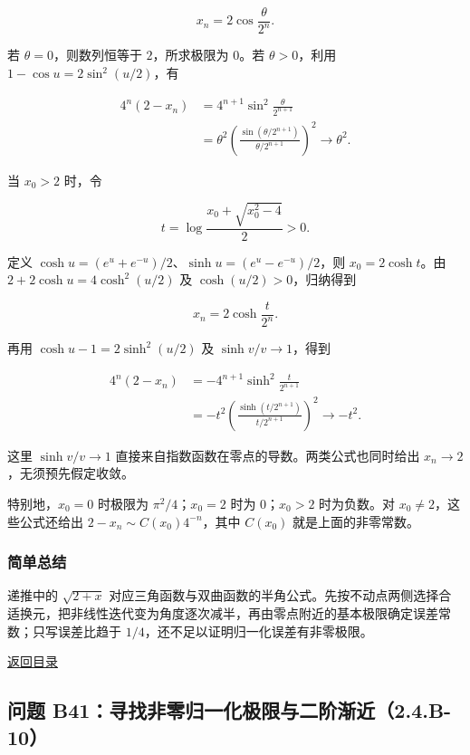 \documentclass[11pt,a4paper]{article}
\begin{document}
\[
x_n=2\cos\frac{\theta}{2^n}.
\]

若 \(\theta=0\)，则数列恒等于 \(2\)，所求极限为 \(0\)。若
\(\theta>0\)，利用 \(1-\cos u=2\sin^2(u/2)\)，有

\[
\begin{aligned}
4^n(2-x_n)
&=4^{n+1}\sin^2\frac{\theta}{2^{n+1}}\\
&=\theta^2\left(\frac{\sin(\theta/2^{n+1})}{\theta/2^{n+1}}\right)^2
\longrightarrow\theta^2.
\end{aligned}
\]

当 \(x_0>2\) 时，令

\[
t=\log\frac{x_0+\sqrt{x_0^2-4}}2>0.
\]

定义 \(\cosh u=(e^u+e^{-u})/2\)、\(\sinh u=(e^u-e^{-u})/2\)，则
\(x_0=2\cosh t\)。由 \(2+2\cosh u=4\cosh^2(u/2)\) 及
\(\cosh(u/2)>0\)，归纳得到

\[
x_n=2\cosh\frac{t}{2^n}.
\]

再用 \(\cosh u-1=2\sinh^2(u/2)\) 及 \(\sinh v/v\to1\)，得到

\[
\begin{aligned}
4^n(2-x_n)
&=-4^{n+1}\sinh^2\frac{t}{2^{n+1}}\\
&=-t^2\left(\frac{\sinh(t/2^{n+1})}{t/2^{n+1}}\right)^2
\longrightarrow-t^2.
\end{aligned}
\]

这里 \(\sinh v/v\to1\) 直接来自指数函数在零点的导数。两类公式也同时给出
\(x_n\to2\)，无须预先假定收敛。

特别地，\(x_0=0\) 时极限为 \(\pi^2/4\)；\(x_0=2\) 时为 \(0\)；\(x_0>2\)
时为负数。对 \(x_0\ne2\)，这些公式还给出
\(2-x_n\sim C(x_0)4^{-n}\)，其中 \(C(x_0)\) 就是上面的非零常数。

\subsubsection{简单总结}\label{ux7b80ux5355ux603bux7ed3-5}

递推中的 \(\sqrt{2+x}\)
对应三角函数与双曲函数的半角公式。先按不动点两侧选择合适换元，把非线性迭代变为角度逐次减半，再由零点附近的基本极限确定误差常数；只写误差比趋于
\(1/4\)，还不足以证明归一化误差有非零极限。

\noindent\hyperref[contents]{返回目录}

\subsection{问题
B41：寻找非零归一化极限与二阶渐近（2.4.B-10）}\label{ux95eeux9898-b41ux5bfbux627eux975eux96f6ux5f52ux4e00ux5316ux6781ux9650ux4e0eux4e8cux9636ux6e10ux8fd12.4.b-10}
\end{document}
